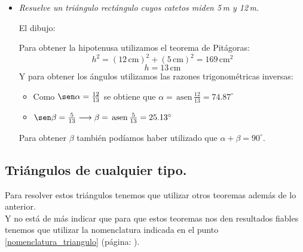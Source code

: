 \documentclass[a4paper,11pt,answers]{exam}
\newcommand{\degree}{^\circ}
\newcommand{\asen}{\,\mathrm{asen}\,}
\begin{document}
\begin{itemize}
\item \emph{Resuelve un triángulo rectángulo cuyos catetos miden 5\,m y 12\,m.}
  \begin{solution}
    El dibujo:
    \begin{center}
    \end{center}
    Para obtener la hipotenusa utilizamos el teorema de Pitágoras:
    \[h^2 = (12\,\text{cm})^2 + (5\,\text{cm})^2 = 169\,\text{cm}^2\]
    \[h = 13\,\text{cm}\]
    Y para obtener los ángulos utilizamos las razones trigonométricas inversas:
    \begin{itemize}
    \item Como $\sen \alpha = \frac{12}{13}$ se obtiene que $\alpha = \asen \frac{12}{13} = 74.87\degree$
    \item $\sen \beta = \frac{5}{13} \longrightarrow \beta = \asen \frac{5}{13} = 25.13\degree$
    \end{itemize}
    Para obtener $\beta$ también podíamos haber utilizado que $\alpha + \beta = 90\degree$.  
  \end{solution}
\end{itemize}

\subsection{Triángulos de cualquier tipo.}
Para resolver estos triángulos tenemos que utilizar otros teoremas además de lo anterior.\\

Y no está de más indicar que para que estos teoremas nos den resultados fiables tenemos que
utilizar la nomenclatura indicada en el punto \ref{nomenclatura_triangulo} (página:
\pageref{nomenclatura_triangulo}).
\end{document}
